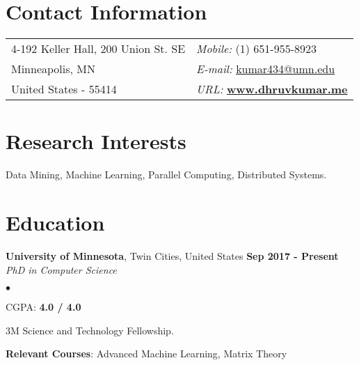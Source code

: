 \documentclass[margin,line]{res}
\newenvironment{list2}{
  \begin{list}{$\bullet$}{%
      \setlength{\itemsep}{0in}
      \setlength{\parsep}{0in} \setlength{\parskip}{0in}
      \setlength{\topsep}{0in} \setlength{\partopsep}{0in} 
      \setlength{\leftmargin}{0.2in}}}{\end{list}}
\begin{document}

\begin{resume}
\section{\sc Contact Information}
\vspace{.05in}
\begin{tabular}{@{}p{3in}p{4in}}
4-192 Keller Hall, 200 Union St. SE         & {\it Mobile:}  (1) 651-955-8923 \\
Minneapolis, MN & {\it E-mail:}  \href{mailto:kumar434@umn.edu }{kumar434@umn.edu }\\
 United States - 55414 &{\it URL:}  \href{http://www.dhruvkumar.me}{\bf www.dhruvkumar.me}
\end{tabular}


\section{\sc Research Interests}
Data Mining, Machine Learning, Parallel Computing, Distributed Systems.

\section{\sc Education}
{\bf University of Minnesota}, Twin Cities, United States \hfill {\bf {Sep 2017 - Present}}\\
{\em PhD in Computer Science }
\vspace*{.3cm}
\begin{list2}
\item CGPA:  {\bf {4.0 / 4.0}}
\item 3M Science and Technology Fellowship.
\item {\bf Relevant Courses}: Advanced Machine Learning, Matrix Theory


\end{list2}
\end{resume}
\end{document}
